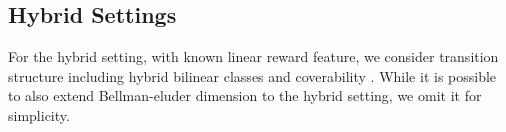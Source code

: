 \subsection{Hybrid Settings}
\label{sec:hybrid}
For the hybrid setting, with known linear reward feature, we consider transition structure including hybrid bilinear classes \citep{liu2025decision} and coverability \citep{xie2022role}. While it is possible to also extend Bellman-eluder dimension to the hybrid setting, we omit it for simplicity. 

